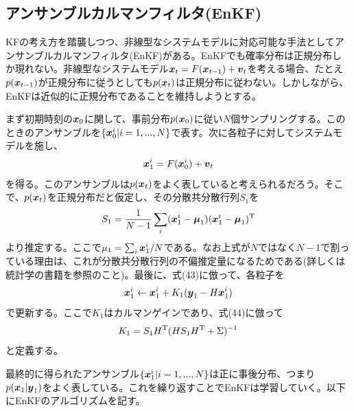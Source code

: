 \documentclass[dvipdfmx, 9pt, a4paper]{jsarticle}
\newcommand{\bm}[1]{{\mbox{\boldmath $#1$}}}
\begin{document}
\subsection{アンサンブルカルマンフィルタ(EnKF)}
KFの考え方を踏襲しつつ、非線型なシステムモデルに対応可能な手法としてアンサンブルカルマンフィルタ(EnKF)がある。EnKFでも確率分布は正規分布しか現れない。非線型なシステムモデル$\bm x_t=F(\bm x_{t-1})+\bm v_t$を考える場合、たとえ$p(\bm x_{t-1})$が正規分布に従うとしても$p(\bm x_t)$は正規分布に従わない。しかしながら、EnKFは近似的に正規分布であることを維持しようとする。\par
まず初期時刻の$\bm x_0$に関して、事前分布$p(\bm x_0)$に従い$N$個サンプリングする。このときのアンサンブルを$\{ \bm x^i_0|i=1,...,N \}$で表す。次に各粒子に対してシステムモデルを施し、
\begin{equation}
\bm x^i_1=F(\bm x^i_0)+\bm v_t \notag
\end{equation}
を得る。このアンサンブルは$p(\bm x_t)$をよく表していると考えられるだろう。そこで、$p(\bm x_t)$を正規分布だと仮定し、その分散共分散行列$S_1$を
\begin{equation}
S_1=\frac{1}{N-1}\sum_i(\bm x^i_1-\bm \mu_1)(\bm x^i_1-\bm \mu_1)^{\rm T} \notag
\end{equation}
より推定する。ここで$\mu_1=\sum_i \bm x^i_1/N$である。なお上式が$N$ではなく$N-1$で割っている理由は、これが分散共分散行列の不偏推定量になるためである(詳しくは統計学の書籍を参照のこと)。最後に、式(43)に倣って、各粒子を
\begin{equation}
\bm x^i_1 \leftarrow \bm x^i_1 + K_1(\bm y_1-H\bm x^i_1) \notag
\end{equation}
で更新する。ここで$K_1$はカルマンゲインであり、式(44)に倣って
\begin{equation}
K_1=S_1H^{\rm T}(HS_1H^{\rm T}+\Sigma)^{-1} \notag
\end{equation}
と定義する。\par
最終的に得られたアンサンブル$\{ \bm x^i_1 |i=1,...,N \}$は正に事後分布、つまり$p(\bm x_1|\bm y_1)$をよく表している。これを繰り返すことでEnKFは学習していく。以下にEnKFのアルゴリズムを記す。
\end{document}
